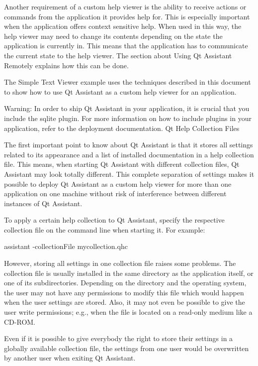 Another requirement of a custom help viewer is the ability to receive actions or commands from the application it provides help for. This is especially important when the application offers context sensitive help. When used in this way, the help viewer may need to change its contents depending on the state the application is currently in. This means that the application has to communicate the current state to the help viewer. The section about Using Qt Assistant Remotely explains how this can be done.

The Simple Text Viewer example uses the techniques described in this document to show how to use Qt Assistant as a custom help viewer for an application.

Warning\-: In order to ship Qt Assistant in your application, it is crucial that you include the sqlite plugin. For more information on how to include plugins in your application, refer to the deployment documentation. Qt Help Collection Files

The first important point to know about Qt Assistant is that it stores all settings related to its appearance and a list of installed documentation in a help collection file. This means, when starting Qt Assistant with different collection files, Qt Assistant may look totally different. This complete separation of settings makes it possible to deploy Qt Assistant as a custom help viewer for more than one application on one machine without risk of interference between different instances of Qt Assistant.

To apply a certain help collection to Qt Assistant, specify the respective collection file on the command line when starting it. For example\-: \begin{DoxyVerb}  assistant -collectionFile mycollection.qhc
\end{DoxyVerb}


However, storing all settings in one collection file raises some problems. The collection file is usually installed in the same directory as the application itself, or one of its subdirectories. Depending on the directory and the operating system, the user may not have any permissions to modify this file which would happen when the user settings are stored. Also, it may not even be possible to give the user write permissions; e.\-g., when the file is located on a read-\/only medium like a C\-D-\/\-R\-O\-M.

Even if it is possible to give everybody the right to store their settings in a globally available collection file, the settings from one user would be overwritten by another user when exiting Qt Assistant.

